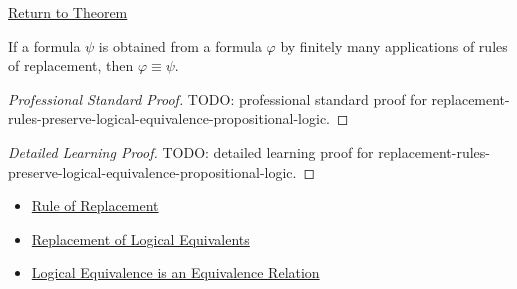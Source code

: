 \newpage
{}
\label{prf:replacement-rules-preserve-logical-equivalence-propositional-logic}

\begin{remark*}[Return]
\hyperref[thm:replacement-rules-preserve-logical-equivalence-propositional-logic]{Return to Theorem}
\end{remark*}

\begin{theorem*}
If a formula \(\psi\) is obtained from a formula \(\varphi\) by finitely many
applications of rules of replacement, then \(\varphi\equiv\psi\).
\end{theorem*}

\begin{proof}[Professional Standard Proof]
\LRAProofBodyStart
TODO: professional standard proof for replacement-rules-preserve-logical-equivalence-propositional-logic.
\end{proof}

\begin{proof}[Detailed Learning Proof]
\LRAProofBodyStart
TODO: detailed learning proof for replacement-rules-preserve-logical-equivalence-propositional-logic.
\end{proof}

\begin{remark*}
\end{remark*}

\begin{dependencies}
\begin{itemize}
  \item \hyperref[def:rule-of-replacement-propositional-logic]{Rule of Replacement}
  \item \hyperref[thm:replacement-of-logical-equivalents-propositional-logic]{Replacement of Logical Equivalents}
  \item \hyperref[thm:logical-equivalence-equivalence-relation]{Logical Equivalence is an Equivalence Relation}
\end{itemize}
\end{dependencies}

\clearpage

